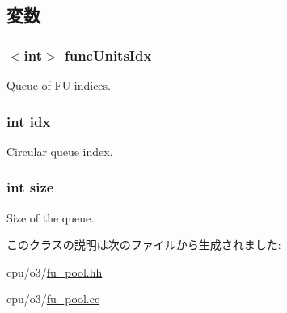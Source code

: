 \subsection{変数}
\hypertarget{classFUPool_1_1FUIdxQueue_a414586295cf439583c9a319205de0b34}{
\subsubsection[{funcUnitsIdx}]{$<$int$>$ {\bf funcUnitsIdx}}}
\label{classFUPool_1_1FUIdxQueue_a414586295cf439583c9a319205de0b34}
Queue of FU indices. \hypertarget{classFUPool_1_1FUIdxQueue_ae40354a1051342eb5a9db005715dcfa9}{
\subsubsection[{idx}]{\setlength{\rightskip}{0pt plus 5cm}int {\bf idx}}}
\label{classFUPool_1_1FUIdxQueue_ae40354a1051342eb5a9db005715dcfa9}
Circular queue index. \hypertarget{classFUPool_1_1FUIdxQueue_a439227feff9d7f55384e8780cfc2eb82}{
\subsubsection[{size}]{\setlength{\rightskip}{0pt plus 5cm}int {\bf size}}}
\label{classFUPool_1_1FUIdxQueue_a439227feff9d7f55384e8780cfc2eb82}
Size of the queue. 

このクラスの説明は次のファイルから生成されました:\begin{DoxyCompactItemize}
\item 
cpu/o3/\hyperlink{fu__pool_8hh}{fu\_\-pool.hh}\item 
cpu/o3/\hyperlink{fu__pool_8cc}{fu\_\-pool.cc}\end{DoxyCompactItemize}
